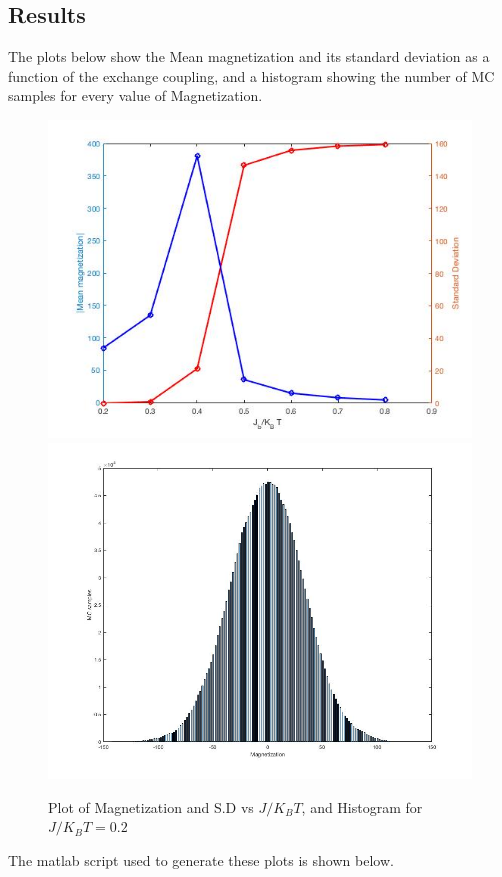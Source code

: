 \documentclass[11pt, oneside]{article}   	%
\begin{document}
\subsection{Results}
The plots below show the Mean magnetization and its standard deviation as a function of the exchange coupling, and a histogram showing the number of MC samples for every value of Magnetization.
	\begin{figure} [!htbp]
	 \includegraphics[scale=0.43]{Magn_SD_plot.jpg}
	 \includegraphics[scale=0.28]{histogram.jpg}
	\caption{Plot of Magnetization and S.D vs $J/K_B T$, and Histogram for $J/K_B T = 0.2$}
	\end{figure}
The matlab script used to generate these plots is shown below.
	
\end{document}
